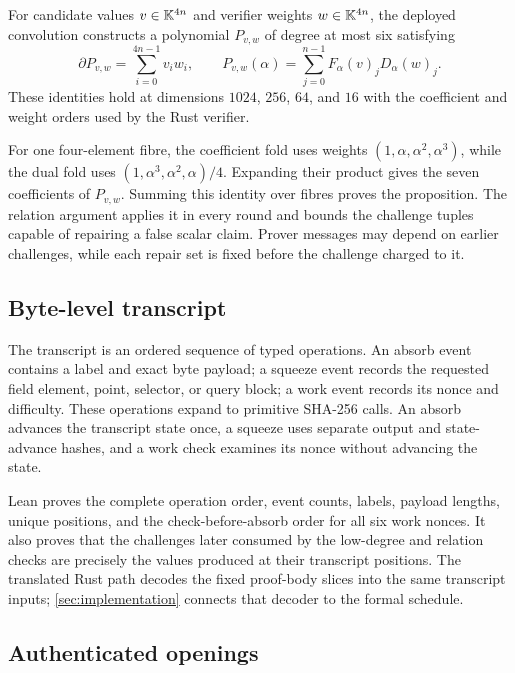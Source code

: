 \begin{proposition}
\label{prop:fold-duality}
For candidate values \(v\in\mathbb{K}^{4n}\) and verifier weights
\(w\in\mathbb{K}^{4n}\), the deployed convolution constructs a polynomial
\(P_{v,w}\) of degree at most six satisfying
\[
  \partial P_{v,w}=\sum_{i=0}^{4n-1}v_iw_i,
  \qquad
  P_{v,w}(\alpha)
  =\sum_{j=0}^{n-1}F_\alpha(v)_jD_\alpha(w)_j.
\]
These identities hold at dimensions \(1024\), \(256\), \(64\), and \(16\)
with the coefficient and weight orders used by the Rust verifier.
\end{proposition}

For one four-element fibre, the coefficient fold uses weights
\((1,\alpha,\alpha^2,\alpha^3)\), while the dual fold uses
\((1,\alpha^3,\alpha^2,\alpha)/4\).  Expanding their product gives the seven
coefficients of \(P_{v,w}\).  Summing this identity over fibres proves the
proposition.  The relation argument applies it in every round and bounds the
challenge tuples capable of repairing a false scalar claim.  Prover messages
may depend on earlier challenges, while each repair set is fixed before the
challenge charged to it.

\subsection{Byte-level transcript}

The transcript is an ordered sequence of typed operations.  An absorb event
contains a label and exact byte payload; a squeeze event records the requested
field element, point, selector, or query block; a work event records its nonce
and difficulty.  These operations expand to primitive SHA-256 calls.  An
absorb advances the transcript state once, a squeeze uses separate output and
state-advance hashes, and a work check examines its nonce without advancing
the state.

Lean proves the complete operation order, event counts, labels, payload
lengths, unique positions, and the check-before-absorb order for all six work
nonces.  It also proves that the challenges later consumed by the low-degree
and relation checks are precisely the values produced at their transcript
positions.  The translated Rust path decodes the fixed proof-body slices into
the same transcript inputs; \cref{sec:implementation} connects that decoder to
the formal schedule.

\subsection{Authenticated openings}

